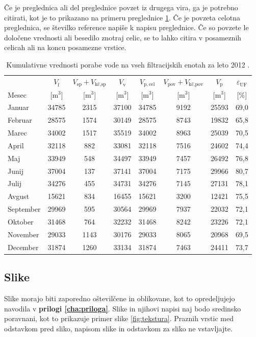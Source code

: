 Če je preglednica ali del preglednice povzet iz drugega vira, ga je potrebno citirati, kot je to prikazano na primeru preglednice \ref{tab:poraba}. Če je povzeta celotna preglednica, se številko reference napiše k napisu preglednice. Če so povzete le določene vrednosti ali besedilo znotraj celic, se to lahko citira v posameznih celicah ali na koncu posamezne vrstice.

\begin{table}[htbp]
	\caption{Kumulativne vrednosti porabe vode na vseh filtracijskih enotah za leto 2012 \cite{grote2021}.}\label{tab:poraba}
	\setlength{\tabcolsep}{4pt}
	\renewcommand{\arraystretch}{1.3}
\begin{tabular*}{\textwidth}{@{\extracolsep{\fill}}l*{7}{c}@{}}
	\toprule
	& $V_\mathrm{f}$
	& $V_\mathrm{sp} + V_\text{kč,sp}$
	& $V_\mathrm{v}$
	& $V_\mathrm{p,cel}$
	& $V_\mathrm{pov} + V_\text{kč,pov}$
	& $V_\mathrm{p}$
	& $\varepsilon_\mathrm{UF}$ \\
	Mesec & [m$^3$] & [m$^3$] & [m$^3$] & [m$^3$] & [m$^3$] & [m$^3$] & [\%] \\
	\midrule
	Januar    & 34785 & 2315 & 37100 & 34785 & 9192 & 25593 & 69,0 \\
	Februar   & 28575 & 1574 & 30149 & 28575 & 8743 & 19832 & 65,8 \\
	Marec     & 34002 & 1517 & 35519 & 34002 & 8963 & 25039 & 70,5 \\
	April     & 32118 &  882 & 33081 & 32118 & 7516 & 24602 & 74,4 \\
	Maj       & 33949 &  548 & 34497 & 33949 & 7457 & 26492 & 76,8 \\
	Junij     & 37004 &  137 & 37141 & 37004 & 7175 & 29966 & 80,7 \\
	Julij     & 34276 &  455 & 34731 & 34276 & 7145 & 27131 & 78,1 \\
	Avgust    & 15621 &  834 & 16455 & 15621 & 3200 & 12421 & 75,5 \\
	September & 29969 &  595 & 30564 & 29969 & 7937 & 22032 & 72,1 \\
	Oktober   & 31468 &  764 & 32232 & 31468 & 8242 & 23226 & 72,1 \\
	November  & 29033 & 1143 & 30176 & 29033 & 8065 & 20968 & 69,5 \\
	December  & 31874 & 1260 & 33134 & 31874 & 7463 & 24411 & 73,7 \\
	\bottomrule
\end{tabular*}
\end{table}


\subsection{Slike}\label{sec:slike}
Slike morajo biti zaporedno oštevilčene in oblikovane, kot to opredeljujejo navodila v \textbf{prilogi \ref{cha:priloga}}. Slike in njihovi napisi naj bodo sredinsko poravnani, kot to prikazuje primer slike \ref{fig:tekstura}. Praznih vrstic med odstavkom pred sliko, napisom slike in odstavkom za sliko ne vstavljajte.

